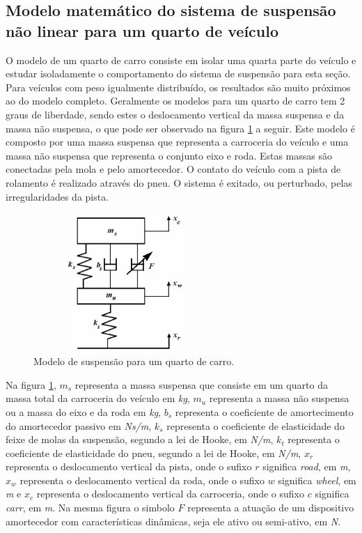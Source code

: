 \subsection{Modelo matemático do sistema de suspensão não linear para um quarto de veículo }
O modelo de um quarto de carro consiste em isolar uma quarta parte do veículo e estudar isoladamente o comportamento do sistema de suspensão para esta seção. Para veículos com peso igualmente distribuído, os resultados são muito próximos ao do modelo completo. Geralmente os modelos para um quarto de carro tem 2 graus de liberdade, sendo estes o deslocamento vertical da massa suspensa e da massa não suspensa, o que pode ser observado na figura \ref{fig:massa_mola_nao_linear_controlavel} a seguir. Este modelo é composto por uma massa suspensa que representa a carroceria do veículo e uma massa não suspensa que representa o conjunto eixo e roda. Estas massas são conectadas pela mola e pelo amortecedor. O contato do veículo com a pista de rolamento é realizado através do pneu. O sistema é exitado, ou perturbado, pelas irregularidades da pista.
\FloatBarrier
\begin{figure}[htbp]
    \begin{centering}
        \includegraphics[width=7cm,height=5.25cm]{img/massa_mola_nao_linear_controlavel.png}
        \caption{Modelo de suspensão para um quarto de carro.} 
        \label{fig:massa_mola_nao_linear_controlavel}
    \end{centering}
\end{figure}
\FloatBarrier
Na figura \ref{fig:massa_mola_nao_linear_controlavel}, $m_s$ representa a massa suspensa que consiste em um quarto da massa total da carroceria do veículo em \emph{kg}, $m_u$ representa a massa não suspensa ou a massa do eixo e da roda em \emph{kg}, $b_s$ representa o coeficiente de amortecimento do amortecedor passivo em \emph{Ns/m}, $k_s$ representa o coeficiente de elasticidade do feixe de molas da suspensão, segundo a lei de Hooke, em \emph{N/m}, $k_t$ representa o coeficiente de elasticidade do pneu, segundo a lei de Hooke, em \emph{N/m}, $x_r$ representa o deslocamento vertical da pista, onde o sufixo $r$ significa \emph{road}, em \emph{m}, $x_w$ representa o deslocamento vertical da roda, onde o sufixo $w$ significa \emph{wheel}, em \emph{m} e $x_c$ representa o deslocamento vertical da carroceria, onde o sufixo $c$ significa \emph{carr}, em \emph{m}. Na mesma figura o simbolo $F$ representa a atuação de um dispositivo amortecedor com características dinâmicas, seja ele ativo ou semi-ativo, em \emph{N}.
    
